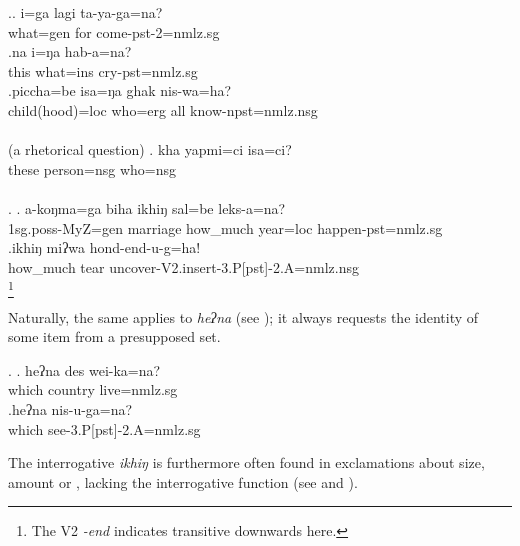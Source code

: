 \ex.\ag. i=ga lagi ta-ya-ga=na?\\
	what{\sc =gen} for come{\sc -pst-2=nmlz.sg}\\
\bg.na   i=ŋa      hab-a=na?\\
this what{\sc =ins} cry{\sc [3sg]-pst=nmlz.sg}\\
 
	\bg.piccha=be    isa=ŋa   ghak nis-wa=ha?\\
	child(hood){\sc =loc} who{\sc =erg} all know{\sc [3A;3.P]-npst=nmlz.nsg}\\
	  \\
	(a rhetorical question)
	\bg.	kha yapmi=ci isa=ci?\\
			these  person{\sc =nsg} who{\sc =nsg} \\
			 \\
	
\ex. \ag. a-koŋma=ga      biha     ikhiŋ   sal=be     leks-a=na?\\
{\sc 1sg.poss-}MyZ{\sc =gen}  marriage how\_much year{\sc =loc} happen{\sc [3sg]-pst=nmlz.sg}\\
 
\bg.ikhiŋ   miʔwa hond-end-u-g=ha!\\
how\_much tear uncover{\sc -V2.insert-3.P[pst]-2.A=nmlz.nsg}\\
\footnote{The V2 \emph{-end} indicates transitive  downwards here.} 

Naturally, the same applies to \emph{heʔna}  (see \Next); it always requests the identity of some item from a presupposed set.

\ex. \ag. heʔna des     wei-ka=na?\\
which country live{=nmlz.sg}\\
 
\bg.heʔna  nis-u-ga=na?\\
which see{\sc -3.P[pst]-2.A=nmlz.sg}\\

The interrogative \emph{ikhiŋ} is furthermore often found in exclamations about size, amount or , lacking the interrogative function (see \Next and \LLast[b]).

